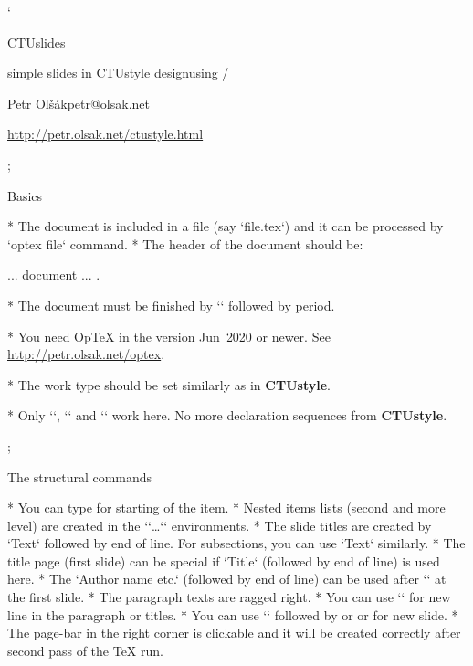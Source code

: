 

\let\s=\relax \let\restore=\relax

\worktype[O/EN]

\activettchar`

\slides

\slideshow 

\tit CTUslides 

\subtit simple slides in CTUstyle design\nl using \OpTeX/

\bigskip
\subtit\Black Petr Olšák\nl petr@olsak.net

\subtit\rm \url{http://petr.olsak.net/ctustyle.html}

\pg; %

\sec Basics

* The document is included in a file (say `file.tex`)\nl
  and it can be processed by `optex file` command.
* The header of the document should be:

\begtt
\slides           %
\worktype[B/EN]   %

\slideshow        %
... document ...
\pg.
\endtt

* The document must be finished by `\pg` followed by period.

* You need OpTeX in the version Jun~2020 or newer.\nl
  See \url{http://petr.olsak.net/optex}.

* The work type should be set similarly as in {\bf\Blue CTUstyle}.

* Only `\worktype`, `\faculty` and `\department`
  work here. No more declaration sequences from {\bf\Blue CTUstyle}.

\pg; %

\sec The structural commands

* You can type \code{\*} for starting of the item.
* Nested items lists (second and more level) are created in
  the `\begitems`\dots`\enditems` environments.
* The slide titles are created by `\sec Text` 
  followed by end of line.\nl 
  For subsections, you can use `\secc Text` similarly.
* The title page (first slide) can be special if `\tit Title`\nl
  (followed by end of line) is used here.
* The `\subtit Author name etc.` (followed by end of line)
  can be used after `\tit` at the first slide.
* The paragraph texts are ragged right.
* You can use `\nl` for new line in the paragraph or titles.
* You can use `\pg` followed by \code{+} or \code{;} or 
  for new slide.
* The page-bar in the right corner is clickable and it will be 
  created correctly after second pass of the \TeX{} run.

